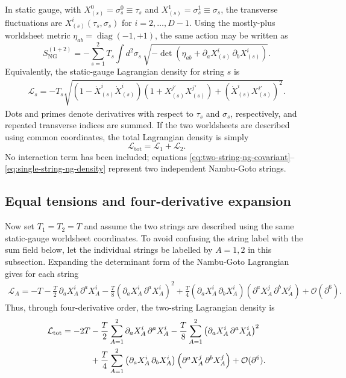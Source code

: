 \documentclass[%
preprint,
amsmath,amssymb,
aps,
prd,
10pt
]{revtex4-2}
\begin{document}
In static gauge, with $X_{(s)}^0=\sigma_s^0\equiv \tau_s$ and
$X_{(s)}^1=\sigma_s^1\equiv \sigma_s$, the transverse fluctuations are
$X_{(s)}^i(\tau_s,\sigma_s)$ for $i=2,\ldots,D-1$.  Using the mostly-plus
worldsheet metric $\eta_{ab}=\operatorname{diag}(-1,+1)$, the same action
may be written as
\begin{equation}
  S_{\mathrm{NG}}^{(1+2)}
  =
  -\sum_{s=1}^{2} T_s \int d^2\sigma_s\,
  \sqrt{-\det\!\left(
    \eta_{ab}
    + \partial_a X_{(s)}^i\,\partial_b X_{(s)}^i
  \right)} .
  \label{eq:two-string-ng-static-gauge}
\end{equation}
Equivalently, the static-gauge Lagrangian density for string $s$ is
\begin{align}
  \mathcal{L}_{s}
  =
  -T_s
  \sqrt{
    \left(1-\dot{X}_{(s)}^i\dot{X}_{(s)}^i\right)
    \left(1+X_{(s)}^{j\prime}X_{(s)}^{j\prime}\right)
    +
    \left(\dot{X}_{(s)}^i X_{(s)}^{i\prime}\right)^2
  } .
  \label{eq:single-string-ng-density}
\end{align}
Dots and primes denote derivatives with respect to $\tau_s$ and $\sigma_s$,
respectively, and repeated transverse indices are summed.  If the two
worldsheets are described using common coordinates, the total Lagrangian
density is simply
\begin{equation}
  \mathcal{L}_{\mathrm{tot}} = \mathcal{L}_1 + \mathcal{L}_2 .
\end{equation}
No interaction term has been included; equations
\eqref{eq:two-string-ng-covariant}--\eqref{eq:single-string-ng-density}
represent two independent Nambu-Goto strings.

\subsection{Equal tensions and four-derivative expansion}

Now set $T_1=T_2=T$ and assume the two strings are described using the same
static-gauge worldsheet coordinates.  To avoid confusing the string label with
the sum field below, let the individual strings be labelled by $A=1,2$ in this
subsection.  Expanding the determinant form of the Nambu-Goto Lagrangian gives
for each string
\begin{align}
  \mathcal{L}_{A}
  =
  -T
  -\frac{T}{2}\,\partial_a X_A^i\,\partial^a X_A^i
  -\frac{T}{8}
    \left(\partial_a X_A^i\,\partial^a X_A^i\right)^2
  +\frac{T}{4}
    \left(\partial_a X_A^i\,\partial_b X_A^i\right)
    \left(\partial^a X_A^j\,\partial^b X_A^j\right)
  +\mathcal{O}(\partial^6) .
  \label{eq:single-string-ng-four-derivative}
\end{align}
Thus, through four-derivative order, the two-string Lagrangian density is
\begin{align}
  \mathcal{L}_{\mathrm{tot}}
  =
  -2T
  &-\frac{T}{2}\sum_{A=1}^{2}
    \partial_a X_A^i\,\partial^a X_A^i
  -\frac{T}{8}\sum_{A=1}^{2}
    \left(\partial_a X_A^i\,\partial^a X_A^i\right)^2
  \notag\\
  &+\frac{T}{4}\sum_{A=1}^{2}
    \left(\partial_a X_A^i\,\partial_b X_A^i\right)
    \left(\partial^a X_A^j\,\partial^b X_A^j\right)
  +\mathcal{O}(\partial^6) .
  \label{eq:two-string-ng-four-derivative}
\end{align}
\end{document}
